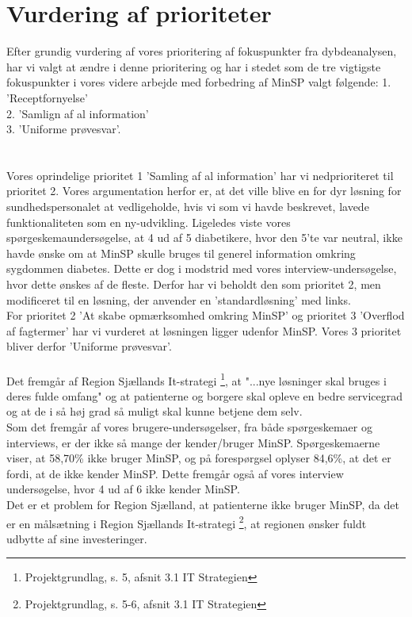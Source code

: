\section{Vurdering af prioriteter}
Efter grundig vurdering af vores prioritering af fokuspunkter fra dybdeanalysen, har vi valgt at ændre i denne prioritering og har i stedet som de tre vigtigste fokuspunkter i vores videre arbejde med forbedring af MinSP valgt følgende:
1. 'Receptfornyelse'\\ 
2. 'Samlign af al information'\\ 
3. 'Uniforme prøvesvar'.\\
\\\\
Vores oprindelige prioritet 1 'Samling af al information' har vi nedprioriteret til prioritet 2.
Vores argumentation herfor er, at det ville blive en for dyr løsning for sundhedspersonalet at vedligeholde, hvis vi som vi havde beskrevet, lavede funktionaliteten som en ny-udvikling.  
Ligeledes viste vores spørgeskemaundersøgelse, at 4 ud af 5 diabetikere, hvor den 5'te var neutral, ikke havde ønske om at MinSP skulle bruges til generel information omkring sygdommen diabetes. Dette er dog i modstrid med vores interview-undersøgelse, hvor dette ønskes af de fleste. Derfor har vi beholdt den som prioritet 2, men modificeret til en løsning, der anvender en 'standardløsning' med links. \\
For prioritet 2 'At skabe opmærksomhed omkring MinSP' og prioritet 3 'Overflod af fagtermer' har vi vurderet at løsningen ligger udenfor MinSP. Vores 3 prioritet bliver derfor 'Uniforme prøvesvar'.
\\\\
Det fremgår af Region Sjællands It-strategi \footnote{Projektgrundlag, s. 5, afsnit 3.1 IT Strategien}, at "...nye løsninger skal bruges i deres fulde omfang" og at patienterne og borgere skal opleve en bedre servicegrad og at de i så høj grad så muligt skal kunne betjene dem selv.\\
Som det fremgår af vores brugere-undersøgelser, fra både spørgeskemaer og interviews, er der ikke så mange der kender/bruger MinSP. Spørgeskemaerne viser, at 58,70\% ikke bruger MinSP, og på forespørgsel oplyser 84,6\%, at det er fordi, at de ikke kender MinSP. Dette fremgår også af vores interview undersøgelse, hvor 4 ud af 6 ikke kender MinSP.\\
Det er et problem for Region Sjælland, at patienterne ikke bruger MinSP, da det er en målsætning i Region Sjællands It-strategi \footnote{Projektgrundlag, s. 5-6, afsnit 3.1 IT Strategien}, at regionen ønsker fuldt udbytte af sine investeringer. 
